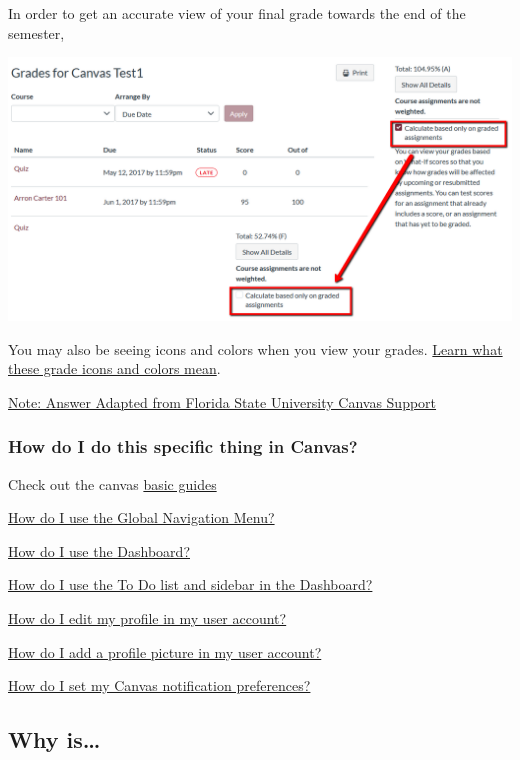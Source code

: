 In order to get an accurate view of your final grade towards the end of the semester,

\begin{center}\includegraphics[width=0.5\linewidth]{img/grades} \end{center}

You may also be seeing icons and colors when you view your grades. \href{https://community.canvaslms.com/docs/DOC-16533-4212829283}{Learn what these grade icons and colors mean}.

\href{https://support.canvas.fsu.edu/kb/article/1068-students-make-sure-you-are-seeing-the-right-grades-in-canvas/}{Note: Answer Adapted from Florida State University Canvas Support}

\hypertarget{how-do-i-do-this-specific-thing-in-canvas}{%
\subsubsection{How do I do this specific thing in Canvas?}\label{how-do-i-do-this-specific-thing-in-canvas}}

Check out the canvas \href{https://community.canvaslms.com/t5/Canvas-Basics-Guide/tkb-p/basics}{basic guides}

\href{https://community.canvaslms.com/docs/DOC-10603-4212710332}{How do I use the Global Navigation Menu?}

\href{https://community.canvaslms.com/docs/DOC-10587-4212710330}{How do I use the Dashboard?}

\href{https://community.canvaslms.com/docs/DOC-10589-4212717407}{How do I use the To Do list and sidebar in the Dashboard?}

\href{https://community.canvaslms.com/docs/DOC-10628-4212710342}{How do I edit my profile in my user account?}

\href{https://community.canvaslms.com/docs/DOC-10599-4212710334}{How do I add a profile picture in my user account?}

\href{https://community.canvaslms.com/docs/DOC-10624-4212710344}{How do I set my Canvas notification preferences?}

\hypertarget{why-is}{%
\subsection{Why is\ldots{}}\label{why-is}}

